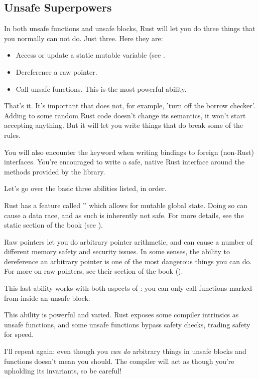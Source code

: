 \subsection*{Unsafe Superpowers}

In both unsafe functions and unsafe blocks, Rust will let you do three things that you normally can not do. Just three. Here they are:

\begin{itemize}
  \item{Access or update a static mutable variable (see .}
  \item{Dereference a raw pointer.}
  \item{Call unsafe functions. This is the most powerful ability.}
\end{itemize}

That's it. It's important that  does not, for example, 'turn off the borrow checker'. Adding  to some 
random Rust code doesn't change its semantics, it won't start accepting anything. But it will let you write things that do break 
some of the rules.

\blank

You will also encounter the  keyword when writing bindings to foreign (non-Rust) interfaces. You're encouraged to write 
a safe, native Rust interface around the methods provided by the library.

\blank

Let's go over the basic three abilities listed, in order.


Rust has a feature called '' which allows for mutable global state. Doing so can cause a data race, and as such 
is inherently not safe. For more details, see the static section of the book (see ).


Raw pointers let you do arbitrary pointer arithmetic, and can cause a number of different memory safety and security issues. In 
some senses, the ability to dereference an arbitrary pointer is one of the most dangerous things you can do. For more on raw pointers, 
see their section of the book ().


This last ability works with both aspects of : you can only call functions marked  from inside an unsafe block.

\blank

This ability is powerful and varied. Rust exposes some compiler intrinsics as unsafe functions, and some unsafe functions bypass 
safety checks, trading safety for speed.

\blank

I'll repeat again: even though you \emph{can do} arbitrary things in unsafe blocks and functions doesn't mean you should. The compiler 
will act as though you're upholding its invariants, so be careful!
